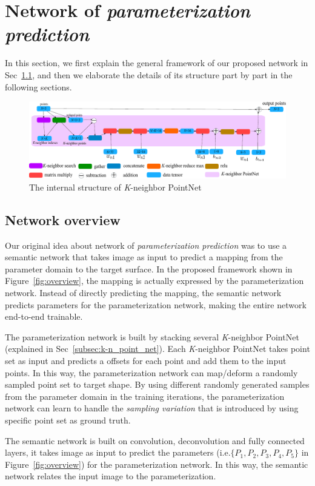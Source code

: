 \section{Network of \emph{parameterization prediction}}
In this section, we first explain the general framework of our proposed network in Sec~\ref{subsec:overview}, and then we elaborate the details of its structure part by part in the following sections.

\begin{figure}[htbp]
	\centering
	\includegraphics[width=\linewidth]{img/net/k-n_pointnet}
	\caption{The internal structure of \textit{K}-neighbor PointNet}
	\label{fig:knpointnet}
\end{figure}

\subsection{Network overview}
\label{subsec:overview}
Our original idea about network of \emph{parameterization prediction} was to use a semantic network that takes image as input to predict a mapping from the parameter domain to the target surface. In the proposed framework shown in Figure~\ref{fig:overview}, the mapping is actually expressed by the parameterization network. Instead of directly predicting the mapping, the semantic network predicts parameters for the parameterization network, making the entire network end-to-end trainable.

The parameterization network is built by stacking several \textit{K}-neighbor PointNet (explained in Sec~\ref{subsec:k-n_point_net}). Each \textit{K}-neighbor PointNet takes point set as input and predicts a offsets for each point and add them to the input points. In this way, the parameterization network can map/deform a randomly sampled point set to target shape. By using different randomly generated samples from the parameter domain in the training iterations, the parameterization network can learn to handle the \textit{sampling variation} that is introduced by using specific point set as ground truth. 

The semantic network is built on convolution, deconvolution and fully connected layers, it takes image as input to predict the parameters (i.e.$\{P_1,P_2,P_3,P_4,P_5\}$ in Figure~\ref{fig:overview}) for the parameterization network. In this way, the semantic network relates the input image to the parameterization.

